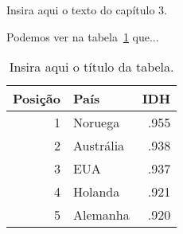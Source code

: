 \label{sec:capitulo03}

Insira aqui o texto do capítulo 3.

Podemos ver na tabela~\ref{tab01} que...


\begin{table}[h]
\centering
\vspace{0.5cm}
\begin{tabular}{r|lr}
 
Posição & País & IDH \\ 
\hline                               
1 & Noruega        & .955 \\
2 & Austrália      & .938 \\
3 & EUA            & .937 \\
4 & Holanda        & .921 \\
5 & Alemanha       & .920
 
\end{tabular}
\caption{Insira aqui o título da tabela.}
\label{tab01}
\end{table}
